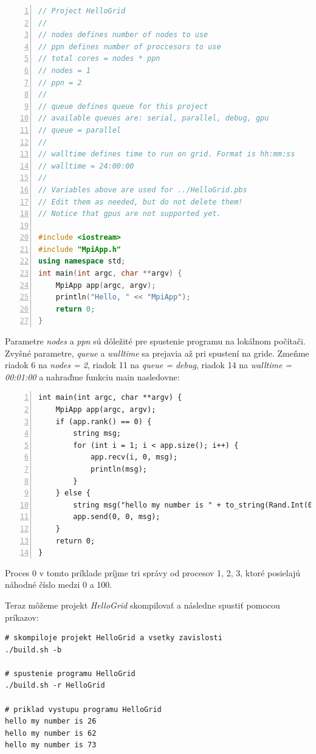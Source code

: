\begin{lstlisting}[language=c++, caption={HelloGrid/src/main.cpp}, numbers=left]
// Project HelloGrid
//
// nodes defines number of nodes to use
// ppn defines number of proccesors to use
// total cores = nodes * ppn
// nodes = 1
// ppn = 2
//
// queue defines queue for this project
// available queues are: serial, parallel, debug, gpu
// queue = parallel
//
// walltime defines time to run on grid. Format is hh:mm:ss
// walltime = 24:00:00
//
// Variables above are used for ../HelloGrid.pbs
// Edit them as needed, but do not delete them!
// Notice that gpus are not supported yet.

#include <iostream>
#include "MpiApp.h"
using namespace std;
int main(int argc, char **argv) {
    MpiApp app(argc, argv);
    println("Hello, " << "MpiApp");
    return 0;
}
\end{lstlisting}
Parametre \textit{nodes} a \textit{ppn} sú dôležité pre spustenie programu na lokálnom počítači. Zvyšné parametre, \textit{queue} a \textit{walltime} sa prejavia až pri spustení na gride.
Zmeňme riadok 6 na \textit{nodes = 2}, riadok 11 na \textit{queue = debug}, riadok 14 na \textit{walltime = 00:01:00}
a nahraďme funkciu main nasledovne:
\begin{lstlisting}[numbers=left]
int main(int argc, char **argv) {
    MpiApp app(argc, argv);
    if (app.rank() == 0) {
        string msg;
        for (int i = 1; i < app.size(); i++) {
            app.recv(i, 0, msg);
            println(msg);
        }
    } else {
        string msg("hello my number is " + to_string(Rand.Int(0, 100)));
        app.send(0, 0, msg);
    }
    return 0;
}  
\end{lstlisting}
Proces 0 v tomto príklade príjme tri správy od procesov 1, 2, 3, ktoré posielajú náhodné číslo medzi 0 a 100.

Teraz môžeme projekt \textit{HelloGrid} skompilovať a následne spustiť pomocou príkazov:
\begin{lstlisting}
# skompiloje projekt HelloGrid a vsetky zavislosti
./build.sh -b

# spustenie programu HelloGrid
./build.sh -r HelloGrid

# priklad vystupu programu HelloGrid
hello my number is 26
hello my number is 62
hello my number is 73
\end{lstlisting}

